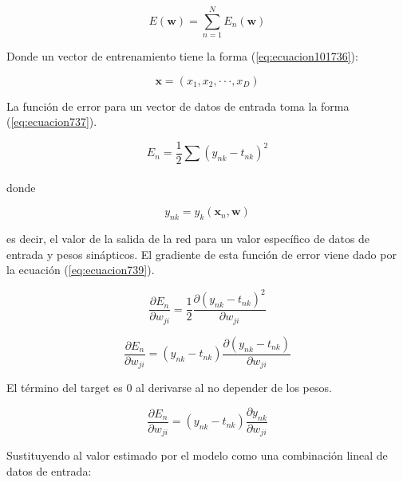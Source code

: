 {\begin{equation}
	E(\textbf{w})=\sum_{n=1}^{N} {E_{n} (\textbf{w})}
	\label{eq:ecuacion736}
\end{equation}

Donde un vector de entrenamiento tiene la forma (\ref{eq:ecuacion101736}):

\begin{equation}
	\textbf{x}=(x_{1},x_{2}, \cdot \cdot \cdot , x_{D} )
	\label{eq:ecuacion101736}
\end{equation}

La función de error para un vector de datos de entrada toma la forma (\ref{eq:ecuacion737}).

\begin{equation}
	E_n=\frac{1}{2} \sum_{}^{} {(y_{nk} - t_{nk})}^2
	\label{eq:ecuacion737}
\end{equation}

donde 

\begin{equation}
	y_{nk}=y_{k} (\textbf{x}_{n},\textbf{w})
	\label{eq:ecuacion738}
\end{equation}

es decir, el valor de la salida de la red para un valor específico de datos de entrada y pesos sinápticos. El gradiente de esta función de error viene dado por la ecuación (\ref{eq:ecuacion739}).

\begin{equation}
	\frac{\partial{E_n}}{\partial{w_{ji}}}=\frac{1}{2} \frac{\partial{{(y_{nk} - t_{nk})}^2}}{\partial{w_{ji}}}
	\label{eq:ecuacion567739}
\end{equation}

\begin{equation}
	\frac{\partial{E_n}}{\partial{w_{ji}}}=({y_{nk} - t_{nk}}) \frac{\partial{({y_{nk} - t_{nk}})}}{\partial{w_{ji}}}
	\label{eq:ecuacion567738}
\end{equation}

El término del target es 0 al derivarse al no depender de los pesos.

\begin{equation}
	\frac{\partial{E_n}}{\partial{w_{ji}}}=({y_{nk} - t_{nk}}) \frac{\partial{y_{nk}}}{\partial{w_{ji}}}
	\label{eq:ecuacion567737}
\end{equation}

Sustituyendo al valor estimado por el modelo como una combinación lineal de datos de entrada:

}

